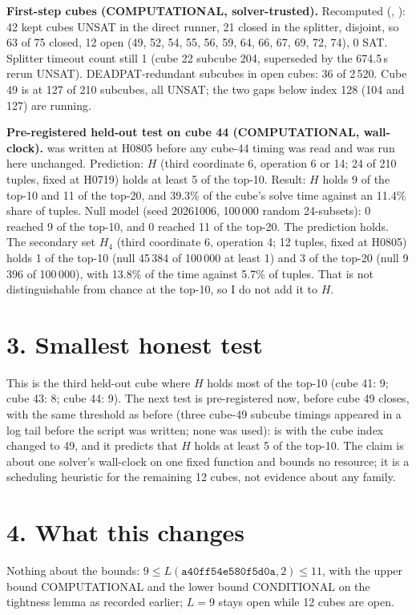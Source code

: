 \documentclass[11pt]{article}
\begin{document}
\textbf{First-step cubes (COMPUTATIONAL, solver-trusted).} Recomputed (, ): 42 kept cubes UNSAT in the direct runner, 21 closed in the splitter, disjoint, so 63 of 75 closed, 12 open (49, 52, 54, 55, 56, 59, 64, 66, 67, 69, 72, 74), 0 SAT. Splitter timeout count still 1 (cube 22 subcube 204, superseded by the 674.5\,s rerun UNSAT). DEADPAT-redundant subcubes in open cubes: 36 of 2\,520. Cube 49 is at 127 of 210 subcubes, all UNSAT; the two gaps below index 128 (104 and 127) are running.

\textbf{Pre-registered held-out test on cube 44 (COMPUTATIONAL, wall-clock).}  was written at H0805 before any cube-44 timing was read and was run here unchanged. Prediction: $H$ (third coordinate 6, operation 6 or 14; 24 of 210 tuples, fixed at H0719) holds at least 5 of the top-10. Result: $H$ holds 9 of the top-10 and 11 of the top-20, and 39.3\% of the cube's solve time against an 11.4\% share of tuples. Null model (seed 20261006, 100\,000 random 24-subsets): 0 reached 9 of the top-10, and 0 reached 11 of the top-20. The prediction holds. The secondary set $H_4$ (third coordinate 6, operation 4; 12 tuples, fixed at H0805) holds 1 of the top-10 (null 45\,384 of 100\,000 at least 1) and 3 of the top-20 (null 9\,396 of 100\,000), with 13.8\% of the time against 5.7\% of tuples. That is not distinguishable from chance at the top-10, so I do not add it to $H$.

\section*{3. Smallest honest test}
This is the third held-out cube where $H$ holds most of the top-10 (cube 41: 9; cube 43: 8; cube 44: 9). The next test is pre-registered now, before cube 49 closes, with the same threshold as before (three cube-49 subcube timings appeared in a log tail before the script was written; none was used):  is  with the cube index changed to 49, and it predicts that $H$ holds at least 5 of the top-10. The claim is about one solver's wall-clock on one fixed function and bounds no resource; it is a scheduling heuristic for the remaining 12 cubes, not evidence about any family.

\section*{4. What this changes}
Nothing about the bounds: $9\le L(\texttt{a40ff54e580f5d0a},2)\le 11$, with the upper bound COMPUTATIONAL and the lower bound CONDITIONAL on the tightness lemma as recorded earlier; $L=9$ stays open while 12 cubes are open.
\end{document}
